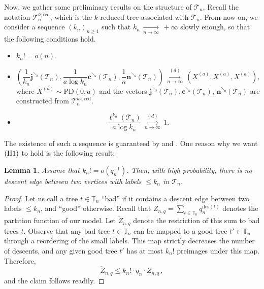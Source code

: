 \documentclass{article}
\newtheorem{lemma}[theorem]{Lemma}
\theoremstyle{remark}
\newcommand{\bT}{\mathbb{T}}
\newcommand{\cv}[1]{\,\underset{#1}{\longrightarrow}\,}
\newcommand{\cT}{\mathcal{T}}
\newcommand{\bc}{\mathbf{c}}
\newcommand{\bj}{\mathbf{j}}
\newcommand{\bn}{\mathbf{n}}
\newcommand{\PoissonDirichlet}[2]{\mathrm{PD}{\left(#1,#2\right)}}
\newcommand{\des}[1]{{\mathrm{des}{\left(#1\right)}}}
\newcommand{\red}{\mathrm{red}}
\begin{document}
Now, we gather some preliminary results on the structure of $\cT_n$. 
Recall the notation $\cT_n^{k,\red}$, which is the $k$-reduced tree associated with $\cT_n$. 
From now on, we consider a sequence $(k_n)_{n \geq 1}$ such that $k_n \cv{n\to\infty} +\infty$ slowly enough, so that the following conditions hold.
\begin{itemize}
\item[(H1)] $k_n!=o(n)$.
\item[(H2)] \begin{equation}
\label{eq:kn}
 \left( \frac{1}{k_n}\bj^\searrow(\cT_n) , \frac{1}{a\log k_n} \bc^\searrow(\cT_n) , \frac1n \bn^\searrow(\cT_n) \right)
        \overset{(d)}{\cv{n\to\infty}} \left( X^{(a)} , X^{(a)} , X^{(a)} \right) ,
\end{equation}
where $X^{(a)} \sim \PoissonDirichlet{0}{a}$ and the vectors $\bj^\searrow(\cT_n), \bc^\searrow(\cT_n)$, $\bn^\searrow(\cT_n)$ are constructed from $\cT_n^{k_n,\red}$.
\item[(H3)] 
\begin{equation}
\label{eq:concentration ell}
\frac{\ell^{k_n}(\cT_n)}{a \log k_n} \overset{(d)}{\cv{n\to\infty}} 1 .
\end{equation}
\end{itemize}
The existence of such a sequence is guaranteed by  and . 
One reason why we want $\rm (H1)$ to hold is the following result:

\begin{lemma}
\label{lem:no small descent}
Assume that $k_n ! = o(q_n^{-1})$.
Then, with high probability, there is no descent edge between two vertices with labels $\le k_n$ in $\cT_n$.
\end{lemma}

\begin{proof}
    Let us call a tree $t\in\bT_n$ \enquote{bad} if it contains a descent edge between two labels $\le k_n$, and \enquote{good} otherwise.
    Recall that $Z_{n,q} = \sum_{t\in\bT_n} q_n^{\des{t}}$ denotes the partition function of our model.
    Let $\check{Z}_{n,q}$ denote the restriction of this sum to bad trees $t$.
    Observe that any bad tree $t\in\bT_n$ can be mapped to a good tree $t'\in\bT_n$ through a reordering of the small labels.
    This map strictly decreases the number of descents, and any given good tree $t'$ has at most $k_n!$ preimages under this map.
    Therefore,
    \[
        \check Z_{n,q} \le k_n! \cdot q_n \cdot Z_{n,q} \,,
    \]
    and the claim follows readily.
\end{proof}
\end{document}
